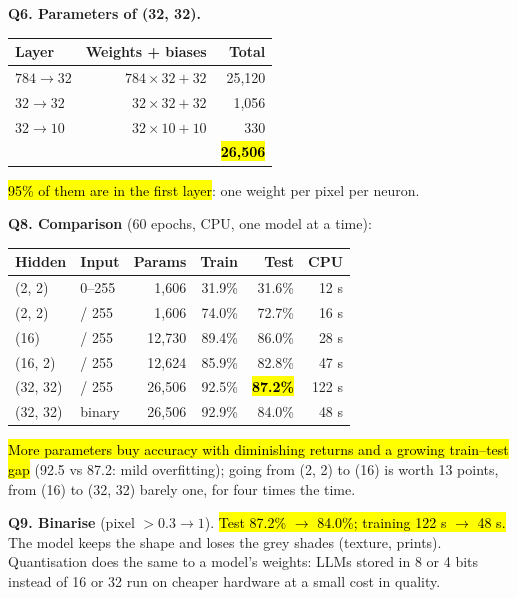 \documentclass[10pt,a4paper]{article}
\newcommand{\q}[1]{\textbf{\color{blue!50!black}#1}}
\begin{document}
\vspace{3pt}
\begin{minipage}[t]{0.38\linewidth}\vspace{0pt}
\q{Q6. Parameters of (32, 32).}

\vspace{2pt}
\begin{tabular}{lrr}
\toprule
Layer & Weights + biases & Total\\
\midrule
$784\to32$ & $784\times32+32$ & 25,120\\
$32\to32$ & $32\times32+32$ & 1,056\\
$32\to10$ & $32\times10+10$ & 330\\
\midrule
 & & \hl{\textbf{26,506}}\\
\bottomrule
\end{tabular}

\vspace{2pt}
\hl{95\% of them are in the first layer}: one weight per pixel per neuron.
\end{minipage}\hfill
\begin{minipage}[t]{0.58\linewidth}\vspace{0pt}
\q{Q8. Comparison} (60 epochs, CPU, one model at a time):

\vspace{2pt}
\begin{tabular}{llrrrr}
\toprule
Hidden & Input & Params & Train & Test & CPU\\
\midrule
(2, 2) & 0--255 & 1,606 & 31.9\% & 31.6\% & 12 s\\
(2, 2) & / 255 & 1,606 & 74.0\% & 72.7\% & 16 s\\
(16) & / 255 & 12,730 & 89.4\% & 86.0\% & 28 s\\
(16, 2) & / 255 & 12,624 & 85.9\% & 82.8\% & 47 s\\
(32, 32) & / 255 & 26,506 & 92.5\% & \hl{\textbf{87.2\%}} & 122 s\\
(32, 32) & binary & 26,506 & 92.9\% & 84.0\% & 48 s\\
\bottomrule
\end{tabular}
\end{minipage}

\vspace{3pt}
\hl{More parameters buy accuracy with diminishing returns and a growing train--test gap} (92.5 vs 87.2: mild
overfitting); going from (2, 2) to (16) is worth 13 points, from (16) to (32, 32) barely one, for four times the time.

\q{Q9. Binarise} (pixel $> 0.3 \to 1$). \hl{Test 87.2\% $\to$ 84.0\%; training 122 s $\to$ 48 s.} The model keeps the
shape and loses the grey shades (texture, prints). Quantisation does the same to a model's weights: LLMs stored in 8
or 4 bits instead of 16 or 32 run on cheaper hardware at a small cost in quality.
\end{document}
